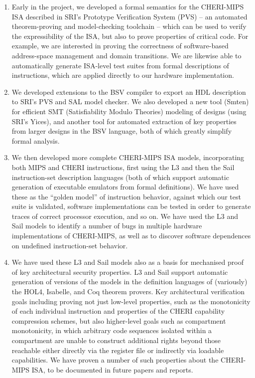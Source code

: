 \begin{enumerate}
\item Early in the project, we developed a formal semantics for the CHERI-MIPS ISA described in
  SRI's Prototype Verification System (PVS) -- an automated theorem-proving
  and model-checking toolchain -- which can be used to verify the
  expressibility of the ISA, but also to prove properties of critical code.
  For example, we are interested in proving the correctness of software-based
  address-space management and domain transitions.
  We are likewise able to automatically generate ISA-level test suites from
  formal descriptions of instructions, which are applied directly to our
  hardware implementation.

\item We developed extensions to the BSV compiler to export
  an HDL description to SRI's PVS and SAL model checker.
  We also developed a new tool (Smten)
for efficient SMT (Satisfiability Modulo Theories) modeling of designs
 (using SRI's Yices), and another tool for
  automated extraction of key properties from larger designs in the
  BSV language, both
  of which greatly simplify formal analysis.


\item We then developed more complete CHERI-MIPS ISA models,
  incorporating both
  MIPS and CHERI instructions, first using the L3 and then the Sail instruction-set description
  languages (both of which support automatic generation of executable
  emulators from formal definitions).
  We have used these as the ``golden model'' of instruction
  behavior, against which our test suite is validated, software implementations can
  be tested in order to generate traces of correct processor execution, and so
  on.
  We have used the L3 and Sail models to identify a number of bugs in multiple hardware
  implementations of CHERI-MIPS, as well as to discover software dependences
  on undefined instruction-set behavior.

\item We have used these L3 and Sail models also as a basis for
  mechanised proof of key architectural security properties.
L3 and Sail support automatic generation of versions of the models in
the definition languages of (variously) the
HOL4, Isabelle, and Coq theorem provers. 
Key architectural verification goals including proving not just low-level
properties, such as the monotonicity of each individual instruction
and properties of the CHERI capability compression schemes, but also
higher-level goals such as compartment monotonicity, in which arbitrary code
sequences isolated within a compartment are unable to construct additional
rights beyond those reachable either directly via the register file or
indirectly via loadable capabilities.
We have proven a number of such properties about the CHERI-MIPS ISA, to be
documented in future papers and reports.


\end{enumerate}
